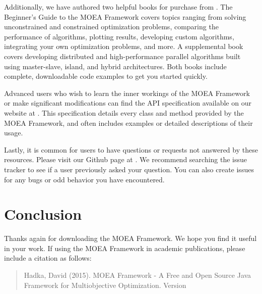 Additionally, we have authored two helpful books for purchase from .  The Beginner's Guide to the MOEA Framework covers topics ranging from solving unconstrained and constrained optimization problems, comparing the performance of algorithms, plotting results, developing custom algorithms, integrating your own optimization problems, and more.  A supplemental book covers developing distributed and high-performance parallel algorithms built using master-slave, island, and hybrid architectures.  Both books include complete, downloadable code examples to get you started quickly.

Advanced users who wish to learn the inner workings of the MOEA Framework or make significant modifications can find the API specification available on our website at .  This specification details every class and method provided by the MOEA Framework, and often includes examples or detailed descriptions of their usage.

Lastly, it is common for users to have questions or requests not answered by these resources.  Please visit our Github page at .  We recommend searching the issue tracker to see if a user previously asked your question.  You can also create issues for any bugs or odd behavior you have encountered.

\section{Conclusion}
Thanks again for downloading the MOEA Framework.  We hope you find it useful in your work.  If using the MOEA Framework in academic publications, please include a citation as follows:

\begin{quote}
  Hadka, David (2015).  MOEA Framework - A Free and Open Source Java Framework for Multiobjective Optimization. Version %
\end{quote}